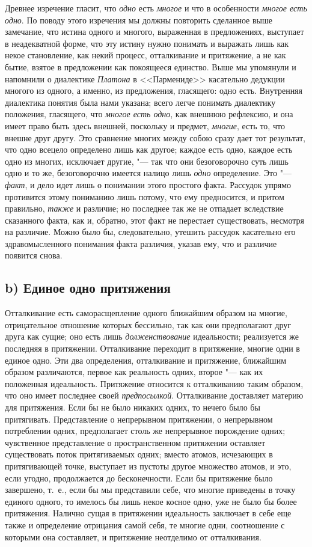 Древнее изречение гласит, что {\em одно} есть
{\em многое} и что в особенности
{\em многое есть одно}. По поводу этого изречения мы
должны повторить сделанное выше замечание, что истина одного и многого,
выраженная в предложениях, выступает в неадекватной форме, что эту истину
нужно понимать и выражать лишь как некое становление, как некий процесс,
отталкивание и притяжение, а не как бытие, взятое в предложении как
покоящееся единство. Выше мы упомянули и напомнили о диалектике
{\em Платона} в <<Пармениде>> касательно дедукции многого
из одного, а именно, из предложения, гласящего: одно есть. Внутренняя
диалектика понятия была нами указана; всего легче понимать диалектику
положения, гласящего, что {\em многое есть одно}, как
внешнюю рефлексию, и она имеет право быть здесь внешней, поскольку и
предмет, {\em многие}, есть то, что внешне друг другу.
Это сравнение многих между собою сразу дает тот результат, что одно всецело
определено лишь как другое; каждое есть одно, каждое есть одно из многих,
исключает другие, "--- так что они безоговорочно суть лишь одно и то же,
безоговорочно имеется налицо лишь {\em одно}
определение. Это "--- {\em факт}, и дело идет лишь о
понимании этого простого факта. Рассудок упрямо противится этому пониманию
лишь потому, что ему предносится, и притом правильно,
{\em также} и различие; но последнее так же не отпадает
вследствие сказанного факта, как и, обратно, этот факт не перестает
существовать, несмотря на различие. Можно было бы, следовательно, утешить
рассудок касательно его здравомысленного понимания факта различия, указав
ему, что и различие появится снова.

\subsection[b) Единое одно притяжения]{b) Единое одно притяжения}
Отталкивание есть саморасщепление одного ближайшим образом на многие,
отрицательное отношение которых бессильно, так как они предполагают друг
друга как сущие; оно есть лишь {\em долженствование}
идеальности; реализуется же последняя в притяжении. Отталкивание переходит
в притяжение, многие одни в единое одно. Эти два определения, отталкивание
и притяжение, ближайшим образом различаются, первое как реальность одних,
второе "--- как их положенная идеальность. Притяжение относится к отталкиванию
таким образом, что оно имеет последнее своей
{\em предпосылкой}. Отталкивание доставляет материю для
притяжения. Если бы не было никаких одних, то нечего было бы притягивать.
Представление о непрерывном притяжении, о непрерывном потреблении одних,
предполагает столь же непрерывное порождение одних; чувственное
представление о пространственном притяжении оставляет существовать поток
притягиваемых одних; вместо атомов, исчезающих в притягивающей точке,
выступает из пустоты другое множество атомов, и это, если угодно,
продолжается до бесконечности. Если бы притяжение было завершено, т.~е.,
если бы мы представили себе, что многие приведены в точку единого одного,
то имелось бы лишь некое косное одно, уже не было бы более притяжения.
Налично сущая в притяжении идеальность заключает в себе еще также и
определение отрицания самой себя, те многие одни, соотношение с которыми
она составляет, и притяжение неотделимо от отталкивания.

